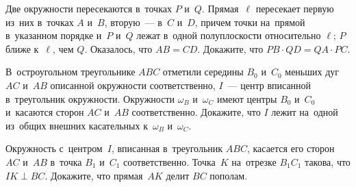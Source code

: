 \begin{problems}
\item
Две окружности пересекаются в~точках $P$ и~$Q$.
Прямая~$\ell$ пересекает первую из~них в~точках $A$ и~$B$, вторую~--- в~$C$
и~$D$, причем точки на~прямой в~указанном порядке и~$P$ и~$Q$ лежат в~одной
полуплоскости относительно $\ell$;
$P$ ближе к~$\ell$, чем $Q$.
Оказалось, что $AB = CD$.
Докажите, что $PB \cdot QD = QA \cdot PC$.

\item
В~остроугольном треугольнике $ABC$ отметили середины $B_0$ и~$C_0$ меньших дуг
$AC$ и~$AB$ описанной окружности соответственно, $I$~--- центр вписанной
в~треугольник окружности.
Окружности $\omega_B$ и~$\omega_C$ имеют центры $B_0$ и~$C_0$ и~касаются сторон
$AC$ и~$AB$ соответственно.
Докажите, что $I$ лежит на~одной из~общих внешних касательных к~$\omega_B$
и~$\omega_C$.

\item
Окружность с~центром~$I$, вписанная в~треугольник $ABC$, касается его сторон
$AC$ и~$AB$ в~точка $B_1$ и~$C_1$ соответственно.
Точка~$K$ на~отрезке $B_1C_1$ такова, что $IK \perp BC$.
Докажите, что прямая~$AK$ делит $BC$ пополам.


\end{problems}

